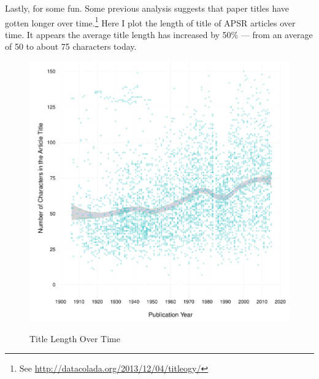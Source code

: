 \documentclass[11pt]{article}
\begin{document}
Lastly, for some fun. Some previous analysis suggests that paper titles have gotten longer over time.\footnote{See \href{http://datacolada.org/2013/12/04/titleogy/}{http://datacolada.org/2013/12/04/titleogy/}} Here I plot the length of title of APSR articles over time. It appears the average title length has increased by 50\% --- from an average of 50 to about 75 characters today.

\begin{figure}[htbp]
\centering
\caption{Title Length Over Time}
\includegraphics[scale=.85]{../figs/title_len_over_time.pdf}
\label{fig:fulltext}
\end{figure}

\clearpage


\end{document}
